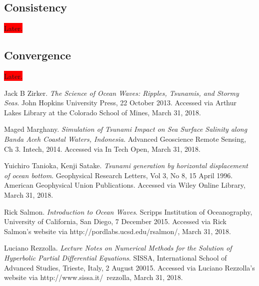 \documentclass[12pt,a4]{article}
\begin{document}
\subsection{Consistency}
\colorbox{red}{Later.}
\subsection{Convergence}
\colorbox{red}{Later.}

\begin{thebibliography}{1}
Jack B Zirker.
\textit{The Science of Ocean Waves: Ripples, Tsunamis, and Stormy Seas}.
John Hopkins University Press, 22 October 2013. 
Accessed via Arthur Lakes Library at the Colorado School of Mines, March 31, 2018.
    
Maged Marghany.
\textit{Simulation of Tsunami Impact on Sea Surface Salinity along Banda Aceh Coastal Waters, Indonesia}.
Advanced Geoscience Remote Sensing, Ch 3. Intech, 2014. Accessed via In Tech Open, March 31, 2018.
    
Yuichiro Tanioka, Kenji Satake.
\textit{Tsunami generation by horizontal displacement of ocean bottom}.
Geophysical Research Letters, Vol 3, No 8, 15 April 1996. American Geophysical Union Publications. Accessed via Wiley Online Library, March 31, 2018.

Rick Salmon.
\textit{Introduction to Ocean Waves}.
Scripps Institution of Oceanography, University of California, San Diego, 7 December 2015. Accessed via Rick Salmon's website via http://pordlabs.ucsd.edu/rsalmon/, March 31, 2018.

Luciano Rezzolla.
\textit{Lecture Notes on Numerical Methods for the Solution of Hyperbolic Partial Differential Equations}.
SISSA, International School of Advanced Studies, Trieste, Italy, 2 August 20015. Accessed via Luciano Rezzolla's website via http://www.sissa.it/~rezzolla, March 31, 2018.

\end{thebibliography}
	
\end{document}

